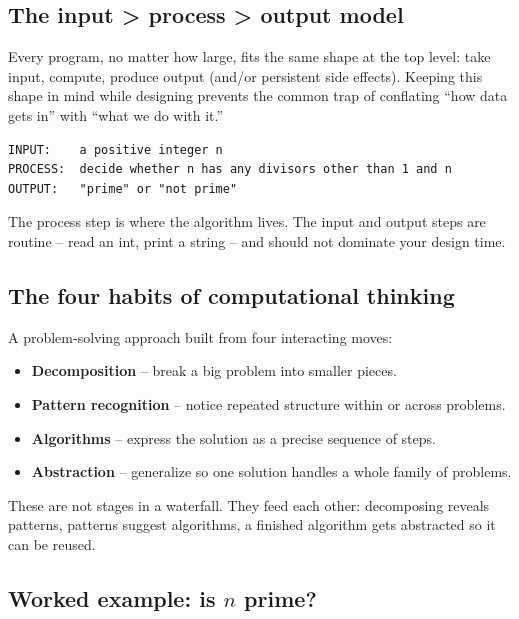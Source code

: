 \documentclass[11pt]{article}
\begin{document}
\subsection{The input > process > output model}

Every program, no matter how large, fits the same shape at the top
level: take input, compute, produce output (and/or persistent side
effects). Keeping this shape in mind while designing prevents the
common trap of conflating ``how data gets in'' with ``what we do with
it.''

\begin{examplebox}
\begin{verbatim}
INPUT:    a positive integer n
PROCESS:  decide whether n has any divisors other than 1 and n
OUTPUT:   "prime" or "not prime"
\end{verbatim}
The process step is where the algorithm lives. The input and output
steps are routine -- read an int, print a string -- and should not
dominate your design time.
\end{examplebox}

\subsection{The four habits of computational thinking}

\begin{defnbox}
A problem-solving approach built from four interacting moves:
\begin{itemize}[leftmargin=*,noitemsep]
    \item \textbf{Decomposition} -- break a big problem into smaller
          pieces.
    \item \textbf{Pattern recognition} -- notice repeated structure
          within or across problems.
    \item \textbf{Algorithms} -- express the solution as a precise
          sequence of steps.
    \item \textbf{Abstraction} -- generalize so one solution handles a
          whole family of problems.
\end{itemize}
These are not stages in a waterfall. They feed each other: decomposing
reveals patterns, patterns suggest algorithms, a finished algorithm
gets abstracted so it can be reused.
\end{defnbox}

\subsection{Worked example: is $n$ prime?}
\end{document}
